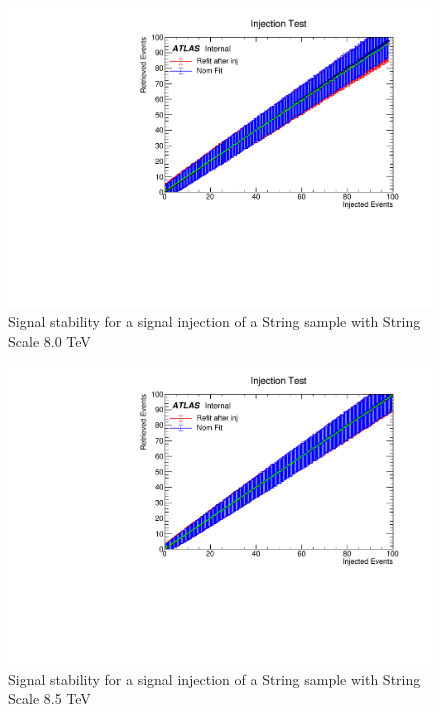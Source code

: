 \begin{figure}
    \centering
    \includegraphics[trim={0cm 0cm 1.6cm 1cm},clip,width=1.0\linewidth]{figures/app-GlobalFitStability/injectionFitStabilityStringScale8000.pdf}
    \caption{Signal stability for a signal injection of a String sample with String Scale 8.0 TeV}
    \label{fig:StringSignalInjectionFitStabilityStudyMs8.0TeV}
\end{figure}
\begin{figure}
    \centering
    \includegraphics[trim={0cm 0cm 1.6cm 1cm},clip,width=1.0\linewidth]{figures/app-GlobalFitStability/injectionFitStabilityStringScale8500.pdf}
    \caption{Signal stability for a signal injection of a String sample with String Scale 8.5 TeV}
    \label{fig:StringSignalInjectionFitStabilityStudyMs8.5TeV}
\end{figure}
